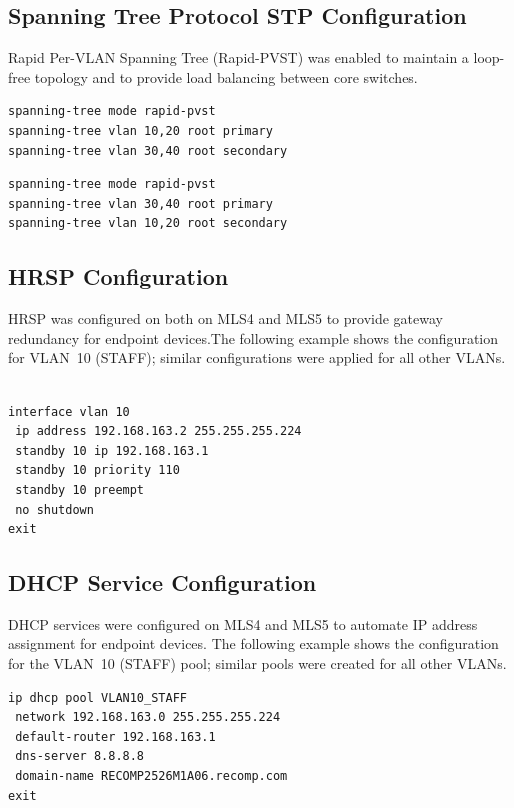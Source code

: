 \subsection{Spanning Tree Protocol \ac{STP} Configuration}

Rapid Per-VLAN Spanning Tree (Rapid-PVST) was enabled to maintain a loop-free topology and to provide load balancing between core switches.

\begin{lstlisting}[caption={RSTP configuration on MLS4}, label={lst:warsaw-rstp-mls4}]
spanning-tree mode rapid-pvst
spanning-tree vlan 10,20 root primary
spanning-tree vlan 30,40 root secondary
\end{lstlisting}

\begin{lstlisting}[caption={RSTP configuration on MLS5}, label={lst:warsaw-rstp-mls5}]
spanning-tree mode rapid-pvst
spanning-tree vlan 30,40 root primary
spanning-tree vlan 10,20 root secondary
\end{lstlisting}

\subsection{\ac{HRSP} Configuration}
HRSP was configured on both on MLS4 and MLS5 to provide gateway redundancy for endpoint devices.The following example shows the configuration for VLAN~10 (STAFF); similar configurations were applied for all other VLANs.
\begin{lstlisting}[caption={HRSP configuration for VLAN10 on MLS4/MLS5}, label={lst:warsaw-hrsp}]
    
interface vlan 10
 ip address 192.168.163.2 255.255.255.224
 standby 10 ip 192.168.163.1
 standby 10 priority 110
 standby 10 preempt
 no shutdown
exit
\end{lstlisting}



\subsection{DHCP Service Configuration}

DHCP services were configured on MLS4 and MLS5 to automate IP address assignment for endpoint devices.  
The following example shows the configuration for the VLAN~10 (STAFF) pool; similar pools were created for all other VLANs.

\begin{lstlisting}[caption={DHCP configuration for VLAN10 on MLS4/MLS5}, label={lst:warsaw-dhcp}]
ip dhcp pool VLAN10_STAFF
 network 192.168.163.0 255.255.255.224
 default-router 192.168.163.1
 dns-server 8.8.8.8
 domain-name RECOMP2526M1A06.recomp.com
exit
\end{lstlisting}
